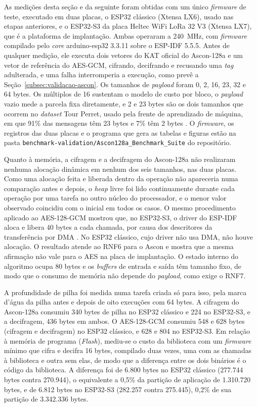As medições desta seção e da seguinte foram obtidas com um único \textit{firmware} de teste, executado em duas placas, o ESP32 clássico (Xtensa LX6), usado nas etapas anteriores, e o ESP32-S3 da placa Heltec WiFi LoRa 32 V3 (Xtensa LX7), que é a plataforma de implantação. Ambas operaram a 240~MHz, com \textit{firmware} compilado pelo \textit{core} arduino-esp32 3.3.11 sobre o ESP-IDF 5.5.5. Antes de qualquer medição, ele executa dois vetores do KAT oficial do Ascon-128a e um vetor de referência do AES-GCM, cifrando, decifrando e recusando uma \textit{tag} adulterada, e uma falha interromperia a execução, como prevê a Seção~\ref{subsec:validacao-ascon}. Os tamanhos de \textit{payload} foram 0, 2, 16, 23, 32 e 64 bytes. Os múltiplos de 16 sustentam o modelo de custo por bloco, o \textit{payload} vazio mede a parcela fixa diretamente, e 2 e 23 bytes são os dois tamanhos que ocorrem no \textit{dataset} Tour Perret, usado pela frente de aprendizado de máquina, em que 91\% das mensagens têm 23 bytes e 7\% têm 2 bytes \cite{tourperret_dataset}. O \textit{firmware}, os registros das duas placas e o programa que gera as tabelas e figuras estão na pasta \texttt{benchmark-validation/Ascon128a\_Benchmark\_Suite} do repositório.

Quanto à memória, a cifragem e a decifragem do Ascon-128a não realizaram nenhuma alocação dinâmica em nenhum dos seis tamanhos, nas duas placas. Como uma alocação feita e liberada dentro da operação não apareceria numa comparação antes e depois, o \textit{heap} livre foi lido continuamente durante cada operação por uma tarefa no outro núcleo do processador, e o menor valor observado coincidiu com o inicial em todos os casos. O mesmo procedimento aplicado ao AES-128-GCM mostrou que, no ESP32-S3, o driver do ESP-IDF aloca e libera 40 bytes a cada chamada, por causa dos descritores da transferência por DMA \cite{espressif2026idf}. No ESP32 clássico, cujo driver não usa DMA, não houve alocação. O resultado atende ao RNF6 para o Ascon e mostra que a mesma afirmação não vale para o AES na placa de implantação. O estado interno do algoritmo ocupa 80 bytes e os \textit{buffers} de entrada e saída têm tamanho fixo, de modo que o consumo de memória não depende do \textit{payload}, como exige o RNF7.

A profundidade de pilha foi medida numa tarefa criada só para isso, pela marca d'água da pilha antes e depois de oito execuções com 64 bytes. A cifragem do Ascon-128a consumiu 340 bytes de pilha no ESP32 clássico e 224 no ESP32-S3, e a decifragem, 436 bytes em ambos. O AES-128-GCM consumiu 548 e 628 bytes (cifragem e decifragem) no ESP32 clássico, e 628 e 804 no ESP32-S3. Em relação à memória de programa (\textit{Flash}), mediu-se o custo da biblioteca com um \textit{firmware} mínimo que cifra e decifra 16 bytes, compilado duas vezes, uma com as chamadas à biblioteca e outra sem elas, de modo que a diferença entre os dois binários é o código da biblioteca. A diferença foi de 6.800 bytes no ESP32 clássico (277.744 bytes contra 270.944), o equivalente a 0,5\% da partição de aplicação de 1.310.720 bytes, e de 6.812 bytes no ESP32-S3 (282.257 contra 275.445), 0,2\% de sua partição de 3.342.336 bytes.

